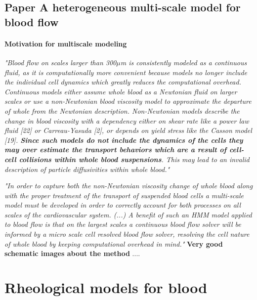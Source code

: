 \documentclass[11pt,letterpaper]{article}
\begin{document}
\newpage
\subsection{Paper A heterogeneous multi-scale model for blood flow}
\paragraph{Motivation for multiscale modeling}

\textit{"Blood flow on scales larger than 300$\mu$m is consistently modeled as a continuous fluid, as it is computationally more convenient because models no longer include the individual cell dynamics which greatly reduces the computational overhead.  {\color{blue}Continuous models either assume whole blood as a Newtonian fluid on larger scales or use a non-Newtonian blood viscosity model to approximate the departure of whole from the Newtonian description.  Non-Newtonian models describe the change in blood viscosity with a dependency either on shear rate like a power law fluid [22] or Carreau-Yasuda [2], or depends on yield stress like the Casson model [19]. \textbf{Since such models do not include the dynamics of the cells they may over estimate the transport behaviors which are a result of cell-cell collisions within whole blood suspensions}}. This may lead to an invalid description of particle diffusivities within whole blood."}

\textit{"In order to capture both the non-Newtonian viscosity change of whole blood along with the proper treatment of the transport of suspended blood cells a multi-scale model must be developed in order to correctly account for both processes on all scales of the cardiovascular system. (...) 
A benefit of such an HMM model applied to blood flow is that on the largest scales a continuous blood flow solver will be informed by a micro scale cell resolved blood flow solver, resolving the cell nature of whole blood by keeping computational overhead in mind."}
\newline\newline
\textbf{Very good schematic images about the method}
....










\newpage
\section{Rheological models for blood}
\end{document}
